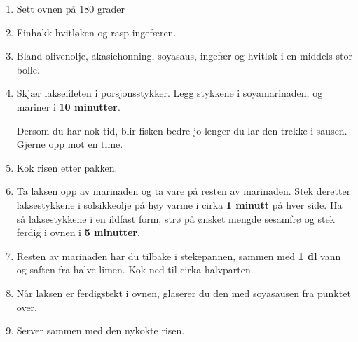 \begin{enumerate}
    \item 
    Sett ovnen på 180 grader
    
    \item
    Finhakk hvitløken og rasp ingefæren.
    
    \item 
    Bland olivenolje, akasiehonning, soyasaus, ingefær og hvitløk i en middels stor bolle.
    
    \item
    Skjær laksefileten i porsjonsstykker. Legg stykkene i soyamarinaden, og mariner i \textbf{10 minutter}. 
    
    Dersom du har nok tid, blir fisken bedre jo lenger du lar den trekke i sausen. Gjerne opp mot en time.
    
    \item
    Kok risen etter pakken.
    
    \item 
    Ta laksen opp av marinaden og ta vare på resten av marinaden. 
    Stek deretter laksestykkene i solsikkeolje på høy varme i cirka \textbf{1 minutt} på hver side. 
    Ha så laksestykkene i en ildfast form, strø på ønsket mengde sesamfrø og stek ferdig i ovnen i \textbf{5 minutter}.
    
    \item
    Resten av marinaden har du tilbake i stekepannen, sammen med \textbf{1 dl} vann og saften fra halve limen. 
    Kok ned til cirka halvparten.
    
    \item
    Når laksen er ferdigstekt i ovnen, glaserer du den med soyasausen fra punktet over. 
    
    \item
    Server sammen med den nykokte risen.
\end{enumerate}